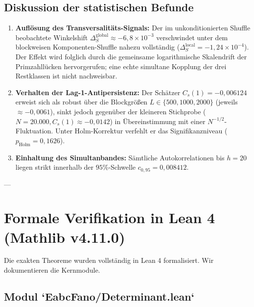 \documentclass[11pt,a4paper]{article}
\theoremstyle{plain}
\theoremstyle{definition}
\theoremstyle{remark}
\begin{document}
\subsection{Diskussion der statistischen Befunde}

\begin{enumerate}
    \item \textbf{Auflösung des Transversalitäts-Signals:} Der im unkonditionierten Shuffle beobachtete Winkelshift $\Delta_S^{\mathrm{global}} \approx -6{,}8 \times 10^{-3}$ verschwindet unter dem blockweisen Komponenten-Shuffle nahezu vollständig ($\Delta_S^{\mathrm{local}} = -1{,}24 \times 10^{-4}$). Der Effekt wird folglich durch die gemeinsame logarithmische Skalendrift der Primzahllücken hervorgerufen; eine echte simultane Kopplung der drei Restklassen ist nicht nachweisbar.
    \item \textbf{Verhalten der Lag-1-Antipersistenz:} Der Schätzer $C_s(1) = -0{,}006124$ erweist sich als robust über die Blockgrößen $L \in \{500, 1000, 2000\}$ (jeweils $\approx -0{,}0061$), sinkt jedoch gegenüber der kleineren Stichprobe ($N=20.000, C_s(1) \approx -0{,}0142$) in Übereinstimmung mit einer $N^{-1/2}$-Fluktuation. Unter Holm-Korrektur verfehlt er das Signifikanzniveau ($p_{\mathrm{Holm}} = 0{,}1626$).
    \item \textbf{Einhaltung des Simultanbandes:} Sämtliche Autokorrelationen bis $h=20$ liegen strikt innerhalb der $95\%$-Schwelle $c_{0{,}95} = 0{,}008412$.
\end{enumerate}

---

\section{Formale Verifikation in Lean 4 (Mathlib v4.11.0)}

Die exakten Theoreme wurden vollständig in Lean 4 formalisiert. Wir dokumentieren die Kernmodule.

\subsection{Modul `EabcFano/Determinant.lean`}
\end{document}
